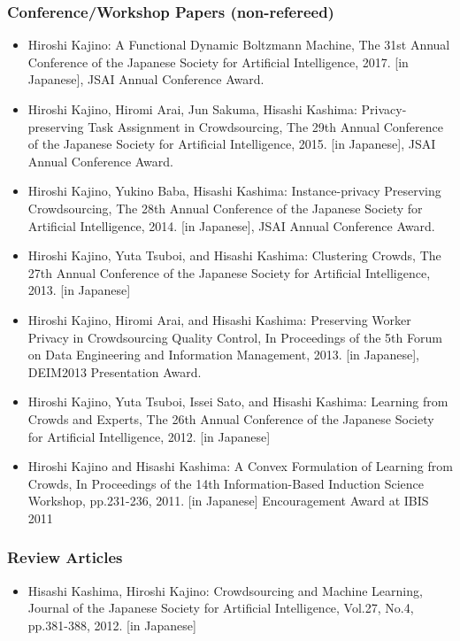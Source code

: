 \documentclass[a4paper,9pt]{article}
\begin{document}
\subsubsection*{Conference/Workshop Papers (non-refereed)}
\begin{itemize}
 \item Hiroshi Kajino: A Functional Dynamic Boltzmann Machine, The 31st Annual Conference of the Japanese Society for Artificial Intelligence, 2017. [in Japanese], JSAI Annual Conference Award.
 \item Hiroshi Kajino, Hiromi Arai, Jun Sakuma, Hisashi Kashima: Privacy-preserving Task Assignment in Crowdsourcing, The 29th Annual Conference of the Japanese Society for Artificial Intelligence, 2015. [in Japanese], JSAI Annual Conference Award.
 \item Hiroshi Kajino, Yukino Baba, Hisashi Kashima: Instance-privacy Preserving Crowdsourcing, The 28th Annual Conference of the Japanese Society for Artificial Intelligence, 2014. [in Japanese], JSAI Annual Conference Award.
 \item Hiroshi Kajino, Yuta Tsuboi, and Hisashi Kashima: Clustering Crowds, The 27th Annual Conference of the Japanese Society for Artificial Intelligence, 2013. [in Japanese]
 \item Hiroshi Kajino, Hiromi Arai, and Hisashi Kashima: Preserving Worker Privacy in Crowdsourcing Quality Control, In Proceedings of the 5th Forum on Data Engineering and Information Management, 2013. [in Japanese], DEIM2013 Presentation Award.
 \item Hiroshi Kajino, Yuta Tsuboi, Issei Sato, and Hisashi Kashima: Learning from Crowds and Experts, The 26th Annual Conference of the Japanese Society for Artificial Intelligence, 2012. [in Japanese]
 \item Hiroshi Kajino and Hisashi Kashima: A Convex Formulation of Learning from Crowds, In Proceedings of the 14th Information-Based Induction Science Workshop, pp.231-236, 2011. [in Japanese] Encouragement Award at IBIS 2011
\end{itemize}
\fi

\subsubsection*{Review Articles}
\begin{itemize}
 \item Hisashi Kashima, Hiroshi Kajino: Crowdsourcing and Machine Learning, Journal of the Japanese Society for Artificial Intelligence, Vol.27, No.4, pp.381-388, 2012. [in Japanese]
\end{itemize}
\end{document}
